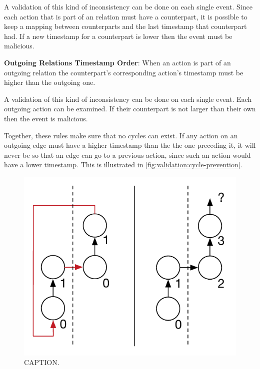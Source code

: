 	A validation of this kind of inconsistency can be done on each single event. Since each action that is part of an relation must have a counterpart, it is possible to keep a mapping between counterparts and the last timestamp that counterpart had. If a new timestamp for a counterpart is lower then the event must be malicious.
	
	\newpar \textbf{Outgoing Relations Timestamp Order}: When an action is part of an outgoing relation the counterpart's corresponding action's timestamp must be higher than the outgoing one.
	
	A validation of this kind of inconsistency can be done on each single event. Each outgoing action can be examined. If their counterpart is not larger than their own then the event is malicious.
	
	\newpar Together, these rules make sure that no cycles can exist. If any action on an outgoing edge must have a higher timestamp than the the one preceding it, it will never be so that an edge can go to a previous action, since such an action would have a lower timestamp. This is illustrated in \autoref{fig:validation:cycle-prevention}.
	
    \begin{figure}[H]
		\centering
		\includegraphics[]{5validation/images/cycle-prevention.pdf}
		\caption{CAPTION.}
		\label{fig:validation:cycle-prevention}
	\end{figure}
	
